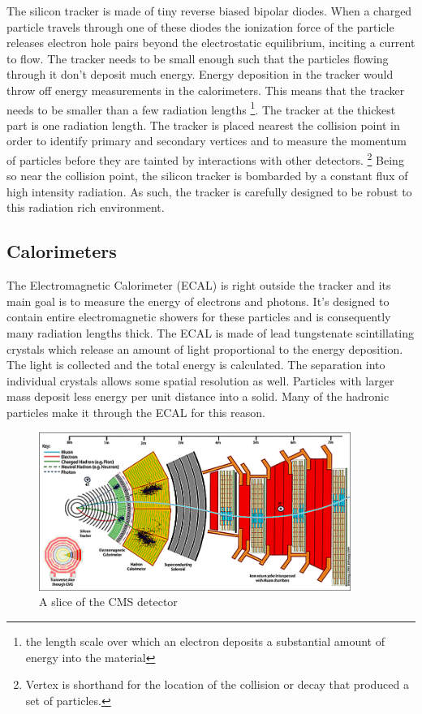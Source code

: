 The silicon tracker is made of tiny reverse biased bipolar diodes. When a charged particle travels through one of these diodes the ionization force of the particle releases electron hole pairs beyond the electrostatic equilibrium, inciting a current to flow. The tracker needs to be small enough such that the particles flowing through it don't deposit much energy. Energy deposition in the tracker would throw off energy measurements in the calorimeters. This means that the tracker needs to be smaller than a few radiation lengths \footnote{the length scale over which an electron deposits a substantial amount of energy into the material}. The tracker at the thickest part is one radiation length. The tracker is placed nearest the collision point in order to identify primary and secondary vertices and to measure the momentum of particles before they are tainted by interactions with other detectors. \footnote{Vertex is shorthand for the location of the collision or decay that produced a set of particles.} Being so near the collision point, the silicon tracker is bombarded by a constant flux of high intensity radiation. As such, the tracker is carefully designed to be robust to this radiation rich environment.

\subsection{Calorimeters}
The Electromagnetic Calorimeter (ECAL) is right outside the tracker and its main goal is to measure the energy of electrons and photons. It's designed to contain entire electromagnetic showers for these particles and is consequently many radiation lengths thick. The ECAL is made of lead tungstenate scintillating crystals which release an amount of light proportional to the energy deposition. The light is collected and the total energy is calculated. The separation into individual crystals allows some spatial resolution as well. Particles with larger mass deposit less energy per unit distance into a solid. Many of the hadronic particles make it through the ECAL for this reason.

\begin{figure}[h!]
  \centering
  \includegraphics[width=4in]{images/cms_slice.jpg}
  \caption
   {A slice of the CMS detector \cite{cmsweb}}
  \label{fig:cmsdetslice}
\end{figure}


